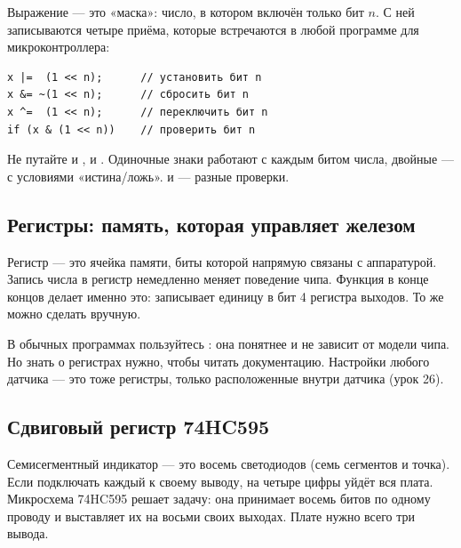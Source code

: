 Выражение  --- это «маска»: число, в котором включён только бит $n$. С ней записываются
четыре приёма, которые встречаются в любой программе для микроконтроллера:

\begin{Verbatim}[fontsize=\small,bgcolor=codebg]
x |=  (1 << n);      // установить бит n
x &= ~(1 << n);      // сбросить бит n
x ^=  (1 << n);      // переключить бит n
if (x & (1 << n))    // проверить бит n
\end{Verbatim}


\begin{caution}
Не путайте \code{\&} и \code{\&\&}, \code{|} и \code{||}. Одиночные знаки работают с каждым битом числа,
двойные --- с условиями «истина/ложь».  и  --- разные проверки.
\end{caution}

\subsection{Регистры: память, которая управляет железом}

Регистр --- это ячейка памяти, биты которой напрямую связаны с аппаратурой. Запись числа в регистр
немедленно меняет поведение чипа. Функция  в конце концов делает именно это:
записывает единицу в бит 4 регистра выходов. То же можно сделать вручную.


В обычных программах пользуйтесь : она понятнее и не зависит от модели чипа. Но
знать о регистрах нужно, чтобы читать документацию. Настройки любого датчика --- это тоже регистры,
только расположенные внутри датчика (урок 26).

\subsection{Сдвиговый регистр 74HC595}

Семисегментный индикатор --- это восемь светодиодов (семь сегментов и точка). Если подключать каждый
к своему выводу, на четыре цифры уйдёт вся плата. Микросхема 74HC595 решает задачу: она принимает
восемь битов по одному проводу и выставляет их на восьми своих выходах. Плате нужно всего три вывода.

